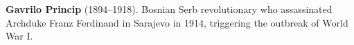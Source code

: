 \textbf{Gavrilo Princip} (1894–1918). Bosnian Serb revolutionary who assassinated Archduke Franz Ferdinand in Sarajevo in 1914, triggering the outbreak of World War I.

